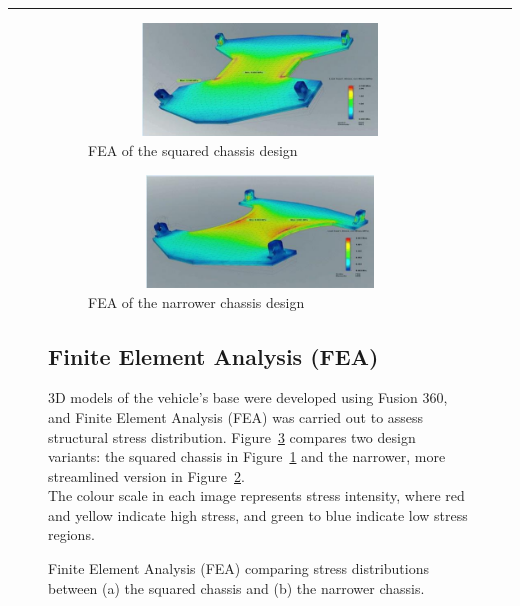 \documentclass{article}
\begin{document}
\vspace{0.8em}\hrule\vspace{0.2em}\noindent
\begin{figure}[H]
	\begin{minipage}{0.45\textwidth}
	\centering
	\begin{subfigure}[t]{0.45\textwidth}
		\centering
		\includegraphics[width=1\textwidth,height=3cm]{images/feaone.png}
		\caption{FEA of the squared chassis design}
		\label{fig:fea_squared}
	\end{subfigure}%
	\hfill
	\begin{subfigure}[t]{0.45\textwidth}
		\centering
		\includegraphics[width=1\textwidth,height=3cm]{images/featwo.png}
		\caption{FEA of the narrower chassis design}
		\label{fig:fea_narrow}
	\end{subfigure}
	\caption{Finite Element Analysis (FEA) comparing stress distributions between (a) the squared chassis and (b) the narrower chassis.}
	\label{fig:fea_comparison}
	\end{minipage}\hfill
	\begin{minipage}{0.5\textwidth}
		\subsection{Finite Element Analysis (FEA)}\large
		3D models of the vehicle’s base were developed using Fusion 360, and Finite Element Analysis (FEA) was carried out to assess structural stress distribution. Figure~\ref{fig:fea_comparison} compares two design variants: the squared chassis in Figure~\ref{fig:fea_squared} and the narrower, more streamlined version in Figure~\ref{fig:fea_narrow}.\\[8pt]
		The colour scale in each image represents stress intensity, where red and yellow indicate high stress, and green to blue indicate low stress regions.
	\end{minipage}		
\end{figure}\noindent
\end{document}
